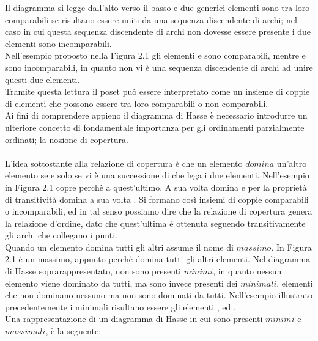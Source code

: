 \documentclass[a4paper,12pt, openright]{report}
\begin{document}
Il diagramma si legge dall'alto verso il basso e due generici elementi sono tra loro comparabili se 
risultano essere uniti da una sequenza discendente di archi; nel caso in cui questa sequenza discendente di 
archi non dovesse essere presente i due elementi sono incomparabili. \\
Nell'esempio proposto nella Figura 2.1 gli elementi  e  sono comparabili, mentre  e  sono incomparabili, 
in quanto non vi è una sequenza discendente di archi ad unire questi due elementi. \\
Tramite questa lettura il poset può essere interpretato come un insieme di coppie di elementi che possono
essere tra loro comparabili o non comparabili. \\
Ai fini di comprendere appieno il diagramma di Hasse è necessario introdurre un ulteriore concetto
di fondamentale importanza per gli ordinamenti parzialmente ordinati; la nozione di copertura. \\
\\
L'idea sottostante alla relazione di copertura è che un elemento $\textit{domina}$ un'altro elemento se e solo se vi è
una successione di  che lega i due elementi. Nell'esempio in Figura 2.1  copre  perchè
 a quest'ultimo. A sua volta  domina  e per la proprietà di transitività  
domina a sua volta . Si formano così insiemi di coppie comparabili o incomparabili, ed in tal senso possiamo dire che la relazione 
di copertura genera la relazione d'ordine, dato che quest'ultima è ottenuta seguendo transitivamente gli archi che collegano i punti. \\
Quando un elemento domina tutti gli altri assume il nome di $\textit{massimo}$. In Figura 2.1  è un massimo, appunto perchè
domina tutti gli altri elementi. Nel diagramma di Hasse soprarappresentato, non sono presenti $\textit{minimi}$, in quanto nessun elemento viene dominato
da tutti, ma sono invece presenti dei $\textit{minimali}$, elementi che non dominano nessuno ma non sono dominati da tutti. 
Nell'esempio illustrato precedentemente i minimali risultano essere gli elementi ,  ed . \\
Una rappresentazione di un diagramma di Hasse in cui sono presenti $\textit{minimi}$ e $\textit{massimali}$, è la seguente;\\
\end{document}
